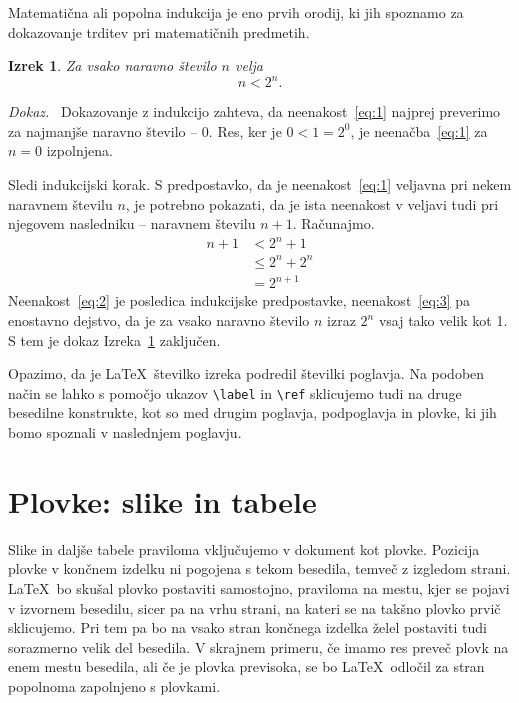 \documentclass[a4paper,12pt,openright]{book}
\newtheorem{izrek}{Izrek}[chapter]
\newenvironment{dokaz}{\emph{Dokaz.}\ }{\hspace{\fill}{$\Box$}}
\begin{document}
Matematična ali popolna indukcija je eno prvih orodij, ki jih spoznamo za dokazovanje trditev pri matematičnih predmetih.
\begin{izrek}
\label{iz:1}
Za vsako naravno število $n$ velja
\begin{equation}
n < 2^n.
\label{eq:1}
\end{equation}
\end{izrek}
\begin{dokaz}
Dokazovanje z indukcijo zahteva, da neenakost~\eqref{eq:1} najprej preverimo za najmanjše naravno število -- $0$. 
Res, ker je $0 < 1 = 2^0$, je neenačba~\eqref{eq:1} za $n=0$ izpolnjena.

Sledi indukcijski korak. S predpostavko, da je neenakost~\eqref{eq:1} veljavna pri nekem naravnem številu $n$, je potrebno pokazati, da je ista neenakost v veljavi tudi pri njegovem nasledniku -- naravnem številu $n+1$. 
Računajmo.
\begin{align}
n+1 & < 2^n + 1       \label{eq:2}\\
       & \le 2^n + 2^n \label{eq:3}\\
       & = 2^{n+1}       \nonumber
\end{align}
Neenakost~\eqref{eq:2} je posledica indukcijske predpostavke, neenakost~\eqref{eq:3} pa enostavno dejstvo, da je za vsako naravno število $n$ izraz $2^n$ vsaj tako velik kot 1. 
S tem je dokaz Izreka~\ref{iz:1} zaključen.
\end{dokaz}

Opazimo, da je \LaTeX\ številko izreka podredil številki poglavja.
Na podoben način se lahko s pomočjo ukazov \verb|\label| in \verb|\ref| sklicujemo tudi na druge besedilne konstrukte, kot so med drugim poglavja, podpoglavja in plovke, ki jih bomo spoznali v naslednjem poglavju.


\chapter{Plovke: slike in tabele}
\label{ch2}

Slike in daljše tabele praviloma vključujemo v dokument kot plovke. 
Pozicija plovke v končnem izdelku ni pogojena s tekom besedila, temveč z izgledom strani. 
\LaTeX\ bo skušal plovko postaviti samostojno, praviloma na mestu, kjer se pojavi v izvornem besedilu, sicer pa na 
vrhu strani, na kateri se na takšno plovko prvič sklicujemo. 
Pri tem pa bo na vsako stran končnega izdelka želel postaviti tudi sorazmerno velik del besedila. 
V skrajnem primeru, če imamo res preveč plovk na enem mestu besedila, ali če je plovka previsoka, se bo \LaTeX\ odločil za stran popolnoma zapolnjeno s plovkami.
\end{document}
